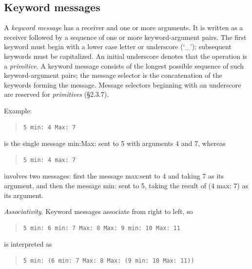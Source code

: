 \documentclass[letterpaper,10pt,english]{sphinxmanual}
\begin{document}

\subsection{Keyword messages}
\label{langref:index-50}\label{langref:keyword-messages}
A \emph{keyword message} has a receiver and one or more arguments. It is written as a receiver followed by a sequence of one or more keyword-argument pairs. The first keyword must begin with a lower case letter or underscore (‘\_’); subsequent keywords must be capitalized. An initial underscore denotes that the operation is a \emph{primitive}. A keyword message consists of the longest possible sequence of such keyword-argument pairs; the message selector is the concatenation of the keywords forming the message. Message selectors beginning with an underscore are reserved for \emph{primitives} (\S{}2.3.7).

Example:
\begin{quote}

\begin{Verbatim}[commandchars=\\\{\}]
5 min: 4 Max: 7
\end{Verbatim}
\end{quote}

is the single message min:Max: sent to 5 with arguments 4 and 7, whereas
\begin{quote}

\begin{Verbatim}[commandchars=\\\{\}]
5 min: 4 max: 7
\end{Verbatim}
\end{quote}

involves two messages: first the message max:sent to 4 and taking 7 as its argument, and then the message min: sent to 5, taking the result of (4 max: 7) as its argument.

\emph{Associativity}. Keyword messages associate from right to left, so
\begin{quote}

\begin{Verbatim}[commandchars=\\\{\}]
5 min: 6 min: 7 Max: 8 Max: 9 min: 10 Max: 11
\end{Verbatim}
\end{quote}

is interpreted as
\begin{quote}

\begin{Verbatim}[commandchars=\\\{\}]
5 min: (6 min: 7 Max: 8 Max: (9 min: 10 Max: 11))
\end{Verbatim}
\end{quote}
\end{document}
